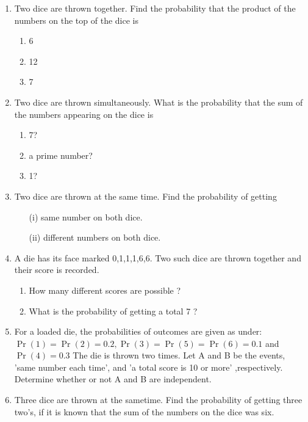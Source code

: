 \begin{enumerate}[label=\thesection.\arabic*,ref=\thesection.\theenumi]
	\item Two dice are thrown together. Find the probability that the product of the numbers
on the top of the dice is
\begin{enumerate}
\item 6
\item 12
\item 7
\end{enumerate}
		\solution
		
  \item Two dice are thrown simultaneously. What is the probability that the sum of the numbers appearing on the dice is 
\begin{enumerate}
\item{7?}
\item{a prime number?}
\item{1?}
\end{enumerate}
\solution

\item Two dice are thrown at the same time. Find the probability of getting
\begin{enumerate}
    \item[(i)] same number on both dice.
    \item[(ii)] different numbers on both dice.
\end{enumerate}

\item A die has its face marked 0,1,1,1,6,6. Two such dice are thrown together and their score is recorded.
\begin{enumerate}
	\item How many different scores are possible ?
	\item What is the probability of getting a total 7 ?  
\end{enumerate}

\item For a loaded die, the probabilities of outcomes are given as under:
$\Pr(1) = \Pr(2) = 0.2, \Pr(3) = \Pr(5) = \Pr(6) = 0.1$ and $\Pr(4) = 0.3$
The die is thrown two times. Let A and B be the events, 'same number each time', and
'a total score is 10 or more' ,respectively. Determine whether or not A and B are independent.

\item Three dice are thrown at the sametime. Find the probability of getting three
two’s, if it is known that the sum of the numbers on the dice was six.


\end{enumerate}
